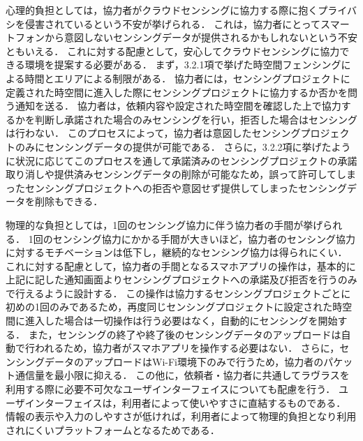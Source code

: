 心理的負担としては，協力者がクラウドセンシングに協力する際に抱くプライバシを侵害されているという不安が挙げられる．
これは，協力者にとってスマートフォンから意図しないセンシングデータが提供されるかもしれないという不安ともいえる．
これに対する配慮として，安心してクラウドセンシングに協力できる環境を提案する必要がある．
まず，3.2.1項で挙げた時空間フェンシングによる時間とエリアによる制限がある．
協力者には，センシングプロジェクトに定義された時空間に進入した際にセンシングプロジェクトに協力するか否かを問う通知を送る．
協力者は，依頼内容や設定された時空間を確認した上で協力するかを判断し承諾された場合のみセンシングを行い，拒否した場合はセンシングは行わない．
このプロセスによって，協力者は意図したセンシングプロジェクトのみにセンシングデータの提供が可能である．
さらに，3.2.2項に挙げたように状況に応じてこのプロセスを通して承諾済みのセンシングプロジェクトの承諾取り消しや提供済みセンシングデータの削除が可能なため，誤って許可してしまったセンシングプロジェクトへの拒否や意図せず提供してしまったセンシングデータを削除もできる．

物理的な負担としては，1回のセンシング協力に伴う協力者の手間が挙げられる．
1回のセンシング協力にかかる手間が大きいほど，協力者のセンシング協力に対するモチベーションは低下し，継続的なセンシング協力は得られにくい．
これに対する配慮として，協力者の手間となるスマホアプリの操作は，基本的に上記に記した通知画面よりセンシングプロジェクトへの承諾及び拒否を行うのみで行えるように設計する．
この操作は協力するセンシングプロジェクトごとに初めの1回のみであるため，再度同じセンシングプロジェクトに設定された時空間に進入した場合は一切操作は行う必要はなく，自動的にセンシングを開始する．
また，センシングの終了や終了後のセンシングデータのアップロードは自動で行われるため，協力者がスマホアプリを操作する必要はない．
さらに，センシングデータのアップロードはWi-Fi環境下のみで行うため，協力者のパケット通信量を最小限に抑える．
この他に，依頼者・協力者に共通してラヴラスを利用する際に必要不可欠なユーザインターフェイスについても配慮を行う．
ユーザインターフェイスは，利用者によって使いやすさに直結するものである．
情報の表示や入力のしやすさが低ければ，利用者によって物理的負担となり利用されにくいプラットフォームとなるためである．

